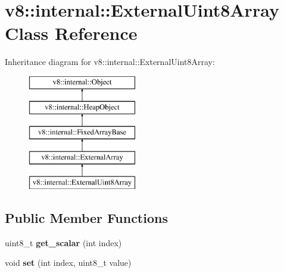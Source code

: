 \hypertarget{classv8_1_1internal_1_1_external_uint8_array}{}\section{v8\+:\+:internal\+:\+:External\+Uint8\+Array Class Reference}
\label{classv8_1_1internal_1_1_external_uint8_array}
Inheritance diagram for v8\+:\+:internal\+:\+:External\+Uint8\+Array\+:\begin{figure}[H]
\begin{center}
\leavevmode
\includegraphics[height=5.000000cm]{classv8_1_1internal_1_1_external_uint8_array}
\end{center}
\end{figure}
\subsection*{Public Member Functions}
\begin{DoxyCompactItemize}
\item 
\hypertarget{classv8_1_1internal_1_1_external_uint8_array_ae574b1d778bbf37044019b8b14a50479}{}uint8\+\_\+t {\bfseries get\+\_\+scalar} (int index)\label{classv8_1_1internal_1_1_external_uint8_array_ae574b1d778bbf37044019b8b14a50479}

\item 
\hypertarget{classv8_1_1internal_1_1_external_uint8_array_a23f47a87f586a79bb9e2aaa1a44559d2}{}void {\bfseries set} (int index, uint8\+\_\+t value)\label{classv8_1_1internal_1_1_external_uint8_array_a23f47a87f586a79bb9e2aaa1a44559d2}

\end{DoxyCompactItemize}
